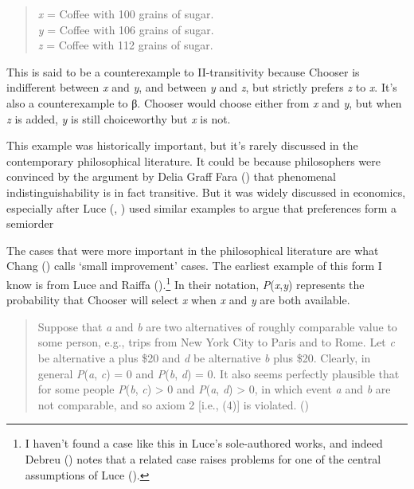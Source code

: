 \documentclass[
  11pt,
  letterpaper,
  DIV=11,
  numbers=noendperiod,
  twoside]{scrartcl}
\begin{document}
\begin{quote}
\emph{x} = Coffee with 100 grains of sugar.\\
\emph{y} = Coffee with 106 grains of sugar.\\
\emph{z} = Coffee with 112 grains of sugar.
\end{quote}

This is said to be a counterexample to II-transitivity because Chooser
is indifferent between \emph{x} and \emph{y}, and between \emph{y} and
\emph{z}, but strictly prefers \emph{z} to \emph{x}. It's also a
counterexample to β. Chooser would choose either from \emph{x} and
\emph{y}, but when \emph{z} is added, \emph{y} is still choiceworthy but
\emph{x} is not.

This example was historically important, but it's rarely discussed in
the contemporary philosophical literature. It could be because
philosophers were convinced by the argument by Delia Graff Fara
() that phenomenal indistinguishability is
in fact transitive. But it was widely discussed in economics, especially
after Luce (,
) used similar examples to argue that
preferences form a semiorder

The cases that were more important in the philosophical literature are
what Chang () calls `small improvement'
cases. The earliest example of this form I know is from Luce and Raiffa
().\footnote{I haven't found a case
  like this in Luce's sole-authored works, and indeed Debreu
  () notes that a related case raises
  problems for one of the central assumptions of Luce
  ().} In their notation,
\emph{P}(\emph{x},\emph{y}) represents the probability that Chooser will
select \emph{x} when \emph{x} and \emph{y} are both available.

\begin{quote}
Suppose that \emph{a} and \emph{b} are two alternatives of roughly
comparable value to some person, e.g., trips from New York City to Paris
and to Rome. Let \emph{c} be alternative a plus \$20 and \emph{d} be
alternative \emph{b} plus \$20. Clearly, in general \emph{P}(\emph{a},
\emph{c}) = 0 and \emph{P}(\emph{b}, \emph{d}) = 0. It also seems
perfectly plausible that for some people \emph{P}(\emph{b}, \emph{c})
\textgreater{} 0 and \emph{P}(\emph{a}, \emph{d}) \textgreater{} 0, in
which event \emph{a} and \emph{b} are not comparable, and so axiom 2
{[}i.e., (4){]} is violated. ()
\end{quote}
\end{document}
